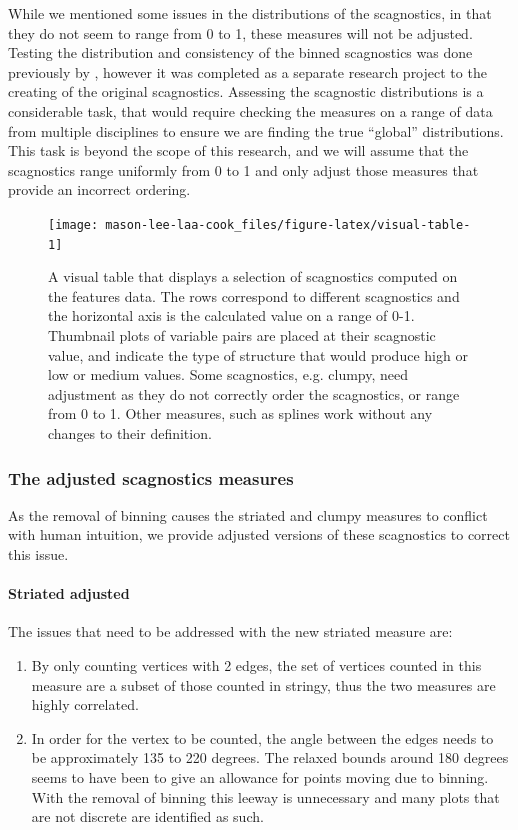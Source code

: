 While we mentioned some issues in the distributions of the scagnostics, in that they do not seem to range from 0 to 1, these measures will not be adjusted. Testing the distribution and consistency of the binned scagnostics was done previously by \citet{scagdist}, however it was completed as a separate research project to the creating of the original scagnostics. Assessing the scagnostic distributions is a considerable task, that would require checking the measures on a range of data from multiple disciplines to ensure we are finding the true ``global'' distributions. This task is beyond the scope of this research, and we will assume that the scagnostics range uniformly from 0 to 1 and only adjust those measures that provide an incorrect ordering.

\begin{figure}
\texttt{[image: mason-lee-laa-cook\_files/figure-latex/visual-table-1]} \caption{A visual table that displays a selection of scagnostics computed on the features data. The rows correspond to different scagnostics and the horizontal axis is the calculated value on a range of 0-1. Thumbnail plots of variable pairs are placed at their scagnostic value, and indicate the type of structure that would produce high or low or medium values. Some scagnostics, e.g. clumpy, need adjustment as they do not correctly order the scagnostics, or range from 0 to 1. Other measures, such as splines work without any changes to their definition.}\label{fig:visual-table}
\end{figure}

\subsubsection{The adjusted scagnostics measures}\label{the-adjusted-scagnostics-measures}

As the removal of binning causes the striated and clumpy measures to conflict with human intuition, we provide adjusted versions of these scagnostics to correct this issue.

\paragraph{Striated adjusted}\label{striated-adjusted}

The issues that need to be addressed with the new striated measure are:

\begin{enumerate}
\def\labelenumi{\arabic{enumi}.}
\tightlist
\item
  By only counting vertices with 2 edges, the set of vertices counted in this measure are a subset of those counted in stringy, thus the two measures are highly correlated.
\item
  In order for the vertex to be counted, the angle between the edges needs to be approximately 135 to 220 degrees. The relaxed bounds around 180 degrees seems to have been to give an allowance for points moving due to binning. With the removal of binning this leeway is unnecessary and many plots that are not discrete are identified as such.
\end{enumerate}

